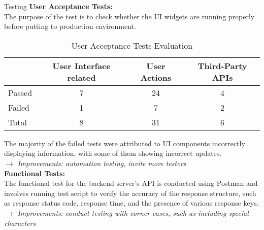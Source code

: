 \begin{block}{Testing}
\textbf{User Acceptance Tests:}\\
The purpose of the test is to check whether the UI widgets are running properly before putting to production environment.
\begin{table}[ht]
    \centering
    \begin{tabular}[t]{lccc}
        \hline
        &User Interface related&User Actions&Third-Party APIs\\
        \hline
        Passed&7&24&4\\
        Failed&1&7&2\\
        Total&8&31&6\\
        \hline
    \end{tabular}
    \caption{User Acceptance Tests Evaluation}
\end{table}%
The majority of the failed tests were attributed to UI components incorrectly displaying information, with some of them showing incorrect updates.\\
\indent $\rightarrow$ \textit{Improvements: automation testing, invite more testers}\\

\textbf{Functional Tests:}\\
The functional test for the backend server's API is conducted using Postman and involves running test script to verify the accuracy of the response structure, such as response status code, response time, and the presence of various response keys.\\
\indent $\rightarrow$ \textit{Improvements: conduct testing with corner cases, such as including special characters}\\
\end{block}